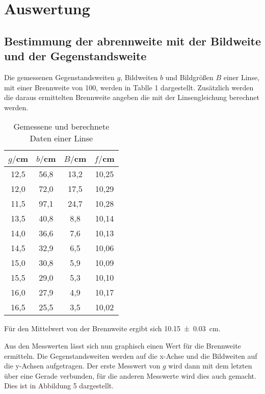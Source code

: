 \section{Auswertung}
\label{sec:Auswertung}

\subsection{Bestimmung der abrennweite mit der Bildweite und der Gegenstandsweite}

Die gemessenen Gegenstandsweiten $g$, Bildweiten $b$ und Bildgrößen $B$ einer Linse, mit einer
Brennweite von 100, werden in Tablle 1 dargestellt. Zusätzlich werden die daraus ermittelten
Brennweite angeben die mit der Linsengleichung berechnet werden.
\begin{table}[H]
  \centering
  \caption{Gemessene und berechnete Daten einer Linse}
  \label{tab:Widerstand}
  \begin{tabular}{c c c c}
    \toprule
    $g/$cm  & $b/$cm & $B / $cm & $f/$cm \\
    \midrule
    12,5 &    56,8  & 13,2 &  10,25   \\
    12,0 &    72,0  & 17,5 &  10,29   \\
    11,5 &    97,1  & 24,7 &  10,28   \\
    13,5 &    40,8  & 8,8  &  10,14  \\
    14,0 &    36,6  & 7,6  &  10,13  \\
    14,5 &    32,9  & 6,5  &  10,06  \\
    15,0 &    30,8  & 5,9  &  10,09  \\
    15,5 &    29,0  & 5,3  &  10,10  \\
    16,0 &    27,9  & 4,9  &  10,17  \\
    16,5 &    25,5  & 3,5  &  10,02  \\
    \bottomrule
  \end{tabular}
\end{table}

Für den Mittelwert von der Brennweite ergibt sich \SI{10.15(3)}{\centi\meter}.

Aus den Messwerten lässt sich nun graphisch einen Wert für die Brennweite ermitteln. Die Gegenstandsweiten
werden auf die x-Achse und die Bildweiten auf die y-Achsen aufgetragen. Der erste Messwert von $g$ wird dann mit
dem letzten über eine Gerade verbunden, für die anderen Messwerte wird dies auch gemacht. Dies ist in
Abbildung 5 dargestellt.




